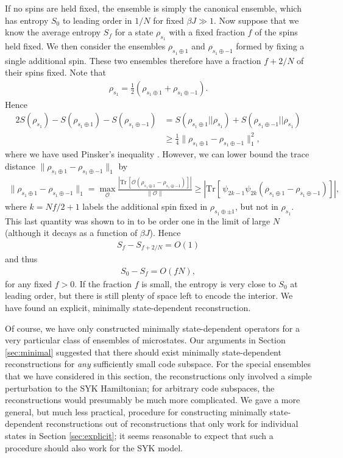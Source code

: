 \documentclass[11pt,a4paper]{article}
\newcommand{\Tr}{\mathrm{Tr}}
\begin{document}
If no spins are held fixed, the ensemble is simply the canonical ensemble, which has entropy $S_0$ to leading order in $1/N$ for fixed $\beta J \gg 1$. Now suppose that we know the average entropy $S_f$ for a state $\rho_{s_1}$ with a fixed fraction $f$ of the spins held fixed. We then consider the ensembles $\rho_{s_1 \oplus 1}$ and $\rho_{s_1 \oplus -1}$ formed by fixing a single additional spin. These two ensembles therefore have a fraction $f+2/N$ of their spins fixed. Note that
\begin{align}
\rho_{s_1} = \frac{1}{2} \left( \rho_{s_1 \oplus 1} + \rho_{s_1 \oplus -1}\right).
\end{align}
Hence
\begin{align}
2 S(\rho_{s_1}) - S(\rho_{s_1 \oplus 1}) - S(\rho_{s_1 \oplus -1}) &=  S(\rho_{s_1 \oplus 1}|| \rho_{s_1}) + S(\rho_{s_1 \oplus -1}|| \rho_{s_1})
\\&\geq \frac{1}{4} \lVert \rho_{s_1 \oplus 1} - \rho_{s_1 \oplus -1} \rVert_1^2,
\end{align}
where we have used Pinsker's inequality \cite{ohya2004quantum}. However, we can lower bound the trace distance $\lVert \rho_{s_1 \oplus 1} - \rho_{s_1 \oplus -1} \rVert_1$ by
\begin{align}
\lVert \rho_{s_1 \oplus 1} - \rho_{s_1 \oplus -1} \rVert_1 = \max_{\mathcal{O}} \frac{\left|\Tr{\,\left[\mathcal{O} \left(\rho_{s_1 \oplus 1} - \rho_{s_1 \oplus -1}\right)\right]}\right|}{\lVert \mathcal{O}\rVert} \geq \left|\Tr \left[\,\psi_{2k-1} \psi_{2k} \left(\rho_{s_1 \oplus 1} - \rho_{s_1 \oplus -1}\right)\right]\right|,
\end{align}
where $k = Nf/2 + 1$ labels the additional spin fixed in $\rho_{s_1 \oplus \pm 1}$, but not in $\rho_{s_1}$. This last quantity was shown to in \cite{kourkoulou2017pure} to be order one in the limit of large $N$ (although it decays as a function of $\beta J$). Hence
\begin{align}
S_f - S_{f+2/N} = O(1)
\end{align}
and thus
\begin{align}
S_0 - S_f = O(f N),
\end{align}
for any fixed $f > 0$. If the fraction $f$ is small, the entropy is very close to $S_0$ at leading order, but there is still plenty of space left to encode the interior. We have found an explicit, minimally state-dependent reconstruction.

Of course, we have only constructed minimally state-dependent operators for a very particular class of ensembles of microstates. Our arguments in Section \ref{sec:minimal} suggested that there should exist minimally state-dependent reconstructions for \emph{any} sufficiently small code subspace. For the special ensembles that we have considered in this section, the reconstructions only involved a simple perturbation to the SYK Hamiltonian; for arbitrary code subspaces, the reconstructions would presumably be much more complicated. We gave a more general, but much less practical, procedure for constructing minimally state-dependent reconstructions out of reconstructions that only work for individual states in Section \ref{sec:explicit}; it seems reasonable to expect that such a procedure should also work for the SYK model.






\end{document}
